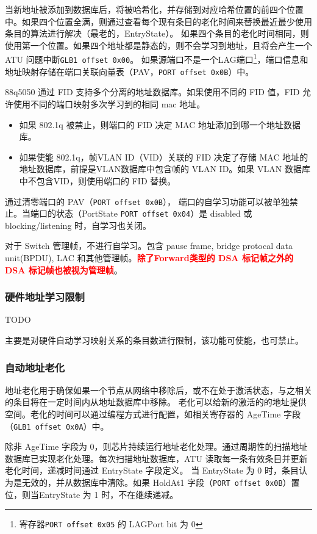 当新地址被添加到数据库后，将被哈希化，并存储到对应哈希位置的前四个位置中。如果四个位置全满，则通过查看每个现有条目的老化时间来替换最近最少使用条目的算法进行解决（最老的，EntryState）。
如果四个条目的老化时间相同，则使用第一个位置。如果四个地址都是静态的，则不会学习到地址，且将会产生一个 ATU 问题中断\lstinline{GLB1 offset 0x00}。
如果源端口不是一个LAG端口\footnote{寄存器\lstinline{PORT offset 0x05} 的 LAGPort bit 为 0}，端口信息和地址映射存储在端口关联向量表（PAV，\lstinline{PORT offset 0x0B}）中。

88q5050 通过 FID 支持多个分离的地址数据库。如果使用不同的 FID 值，FID 允许使用不同的端口映射多次学习到的相同 mac 地址。

\begin{itemize}
    \item 如果 802.1q 被禁止，则端口的 FID 决定 MAC 地址添加到哪一个地址数据库。
    \item 如果使能 802.1q，帧VLAN ID（VID）关联的 FID 决定了存储 MAC 地址的地址数据库，前提是VLAN数据库中包含帧的 VLAN ID。如果 VLAN 数据库中不包含VID，则使用端口的 FID 替换。
\end{itemize}

通过清零端口的 PAV（\lstinline{PORT offset 0x0B}）， 端口的自学习功能可以被单独禁止。当端口的状态（PortState \lstinline{PORT offset 0x04}）是 disabled 或 blocking/listening 时，自学习也关闭。

对于 Switch 管理帧，不进行自学习。包含 pause frame, bridge protocal data unit(BPDU), LAC 和其他管理帧。\textcolor{red}{\textbf{除了Forward类型的 DSA 标记帧之外的 DSA 标记帧也被视为管理帧}}。

\subsubsection{硬件地址学习限制}
TODO

主要是对硬件自动学习映射关系的条目数进行限制，该功能可使能，也可禁止。

\subsubsection{自动地址老化}
地址老化用于确保如果一个节点从网络中移除后，或不在处于激活状态，与之相关的条目将在一定时间内从地址数据库中移除。
老化可以给新的激活的的地址提供空间。老化的时间可以通过编程方式进行配置，如相关寄存器的 AgeTime 字段（\lstinline{GLB1 offset 0x0A}）中。

除非 AgeTime 字段为 0，则芯片持续运行地址老化处理。通过周期性的扫描地址数据库已实现老化处理。每次扫描地址数据库，ATU 读取每一条有效条目并更新老化时间，递减时间通过 EntryState 字段定义。
当 EntryState 为 0 时，条目认为是无效的，并从数据库中清除。如果 HoldAt1 字段（\lstinline{PORT offset 0x0B}）置位，则当EntryState 为 1 时，不在继续递减。

